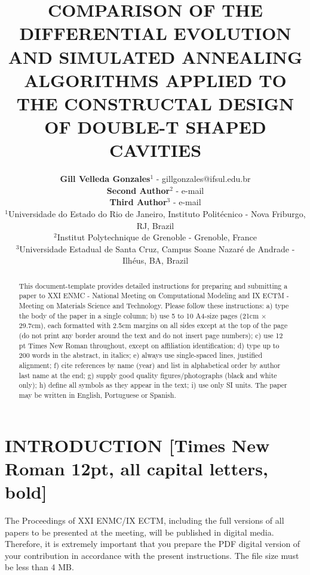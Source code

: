 \documentclass[12pt,fleqn]{article}
\title{COMPARISON OF THE DIFFERENTIAL EVOLUTION AND SIMULATED ANNEALING ALGORITHMS APPLIED TO THE CONSTRUCTAL DESIGN OF DOUBLE-T SHAPED CAVITIES}
\author
    {\rm \begin{tabular}{l} 
    \textbf{Gill Velleda Gonzales}$^{1}$ - {\textnormal gillgonzales@ifsul.edu.br}\\%
    \textbf{Second Author}$^{2}$ - {\textnormal e-mail}\\
    \textbf{Third Author}$^{3}$ - {\textnormal e-mail}\\
    {\fontsize{11}{0}\selectfont $^{1}$Universidade do Estado do Rio de Janeiro, Instituto Politécnico - Nova Friburgo, RJ, Brazil}\vspace*{-0.05cm} \\
    {\fontsize{11}{0}\selectfont $^{2}$Institut Polytechnique de Grenoble - Grenoble, France}\vspace*{-0.05cm}\\
    {\fontsize{11}{0}\selectfont $^{3}$Universidade Estadual de Santa Cruz, Campus Soane Nazaré de Andrade - Ilhéus, BA, Brazil}
  \end{tabular}}
\renewcommand{\headrulewidth}{0.0pt}
\begin{document}
\maketitle

\thispagestyle{firspagetstyle}

\renewcommand{\headrulewidth}{0.0pt}
\rhead{}

\begin{abstract}
This document-template provides detailed instructions for preparing and submitting a paper to XXI ENMC - National Meeting on Computational Modeling and IX ECTM -Meeting on Materials Science and Technology. Please follow these instructions: a) type the body of the paper in a single column; b) use 5 to 10 A4-size pages (21cm $\times$ 29.7cm), each formatted with 2.5cm margins on all sides except at the top of the page (do not print any border around the text and do not insert page numbers); c) use 12 pt Times New Roman throughout, except on affiliation identification; d) type up to 200 words in the abstract, in italics; e) always use single-spaced lines, justified alignment; f) cite references by name (year) and list in alphabetical order by author last name at the end; g) supply good quality figures/photographs (black and white only); h) define all symbols as they appear in the text; i) use only SI units. The paper may be written in English, Portuguese or Spanish.
\end{abstract}


\pagestyle{fancy}

\section{INTRODUCTION [Times New Roman 12pt, all capital letters, bold]}
The Proceedings of XXI ENMC/IX ECTM, including the full versions of all papers to be presented at the meeting, will be published in digital media. Therefore, it is extremely important that you prepare the PDF digital version of your contribution in accordance with the present instructions. The file size must be less than 4 MB.
\end{document}

